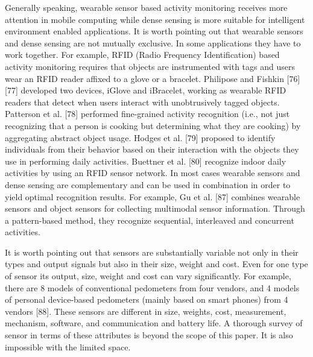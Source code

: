 Generally speaking, wearable sensor based activity monitoring receives more attention in mobile computing while dense sensing is more suitable for intelligent environment enabled applications. It is worth pointing out that wearable sensors and dense sensing are not mutually exclusive. In some applications they have to work together. For example, RFID (Radio Frequency Identification) based activity monitoring requires that objects are instrumented with tags and users wear an RFID reader affixed to a glove or a bracelet. Philipose and Fishkin [76] [77] developed two devices, iGlove and iBracelet, working as wearable RFID readers that detect when users interact with unobtrusively tagged objects. Patterson et al. [78] performed fine-grained activity recognition (i.e., not just recognizing that a person is cooking but determining what they are cooking) by aggregating abstract object usage. Hodges et al. [79] proposed to identify individuals from their behavior based on their interaction with the objects they use in performing daily activities. Buettner et al. [80] recognize indoor daily activities by using an RFID sensor network. In most cases wearable sensors and dense sensing are complementary and can be used in combination in order to yield optimal recognition results. For example, Gu et al. [87] combines wearable sensors and object sensors for collecting multimodal sensor information. Through a pattern-based method, they recognize sequential, interleaved and concurrent activities.

It is worth pointing out that sensors are substantially variable not only in their types and output signals but also in their size, weight and cost. Even for one type of sensor its output, size, weight and cost can vary significantly. For example, there are 8 models of conventional pedometers from four vendors, and 4 models of personal device-based pedometers (mainly based on smart phones) from 4 vendors [88]. These sensors are different in size, weights, cost, measurement, mechanism, software, and communication and battery life. A thorough survey of sensor in terms of these attributes is beyond the scope of this paper. It is also impossible with the limited space.
